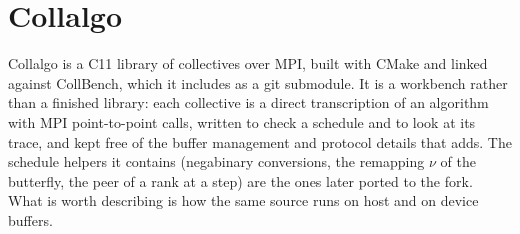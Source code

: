 \section{Collalgo}\label{sec:sw-collalgo}

Collalgo is a C11 library of \bine{} collectives over MPI, built with CMake and linked against CollBench, which it includes as a git submodule.
It is a workbench rather than a finished library: each collective is a direct transcription of an algorithm with MPI point-to-point calls, written to check a schedule and to look at its trace, and kept free of the buffer management and protocol details that \nccl{} adds.
The schedule helpers it contains (negabinary conversions, the remapping $\nu$ of the butterfly, the peer of a rank at a step) are the ones later ported to the \nccl{} fork.
What is worth describing is how the same source runs on host and on device buffers.

